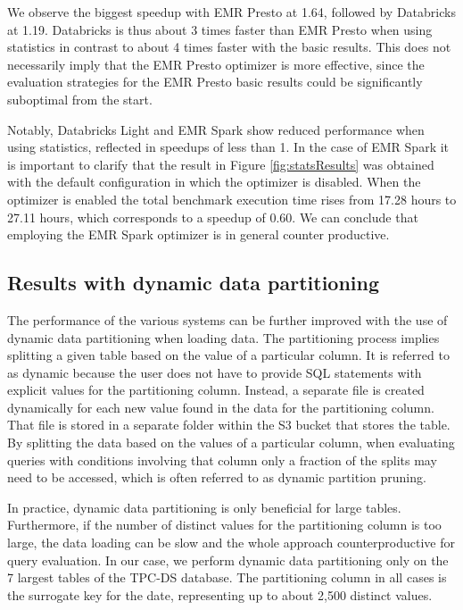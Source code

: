 We observe the biggest speedup with EMR Presto at 1.64, followed by Databricks at 1.19. Databricks is thus about 3 times faster than EMR Presto when using statistics in contrast to about 4 times faster with the basic results. This does not necessarily imply that the EMR Presto optimizer is more effective, since the evaluation strategies for the EMR Presto basic results could be significantly suboptimal from the start.

Notably, Databricks Light and EMR Spark show reduced performance when using statistics, reflected in speedups of less than 1. In the case of EMR Spark it is important to clarify that the result in Figure \ref{fig:statsResults} was obtained with the default configuration in which the optimizer is disabled. When the optimizer is enabled the total benchmark execution time rises from 17.28 hours to 27.11 hours, which corresponds to a speedup of 0.60. We can conclude that employing the EMR Spark optimizer is in general counter productive.

\subsection{Results with dynamic data partitioning}\label{statsResults}

The performance of the various systems can be further improved with the use of dynamic data partitioning when loading data. The partitioning process implies splitting a given table based on the value of a particular column. It is referred to as dynamic because the user does not have to provide SQL statements with explicit values for the partitioning column. Instead, a separate file is created dynamically for each new value found in the data for the partitioning column. That file is stored in a separate folder within the S3 bucket that stores the table. By splitting the data based on the values of a particular column, when evaluating queries with conditions involving that column only a fraction of the splits may need to be accessed, which is often referred to as dynamic partition pruning.

In practice, dynamic data partitioning is only beneficial for large tables. Furthermore, if the number of distinct values for the partitioning column is too large, the data loading can be slow and the whole approach counterproductive for query evaluation. In our case, we perform dynamic data partitioning only on the 7 largest tables of the TPC-DS database. The partitioning column in all cases is the surrogate key for the date, representing up to about 2,500 distinct values.








